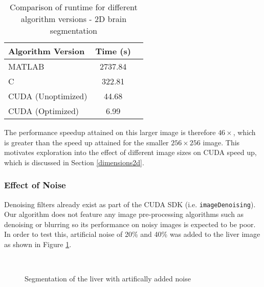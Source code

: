 \begin{table}[h]
\centering
\begin{tabular}{ | l | c | r | }
	\hline
	Algorithm Version  & Time (s)\\ \hline
  MATLAB 						 & 2737.84 \\
  C 								 & 322.81 \\
  CUDA (Unoptimized) & 44.68 \\
  CUDA (Optimized)   & 6.99  \\
  \hline
\end{tabular}\caption{Comparison of runtime for different algorithm versions - 2D brain segmentation}
\label{braintime}
\end{table}

The performance speedup attained on this larger image is therefore $46 \times$, which is greater than the speed up attained for the smaller $256 \times 256$ image. This motivates exploration into the effect of different image sizes on CUDA speed up, which is discussed in Section \ref{dimensions2d}. 

\subsubsection{Effect of Noise}

Denoising filters already exist as part of the CUDA SDK (i.e. \texttt{imageDenoising}). Our algorithm does not feature any image pre-processing algorithms such as denoising or blurring so its performance on noisy images is expected to be poor. In order to test this, artificial noise of 20\% and 40\% was added to the liver image as shown in Figure \ref{fig:livernoise}. 

\begin{figure}[h]
  \begin{center}
    \\
  \end{center}
  \caption{Segmentation of the liver with artifically added noise}
  \label{fig:livernoise}
\end{figure}


